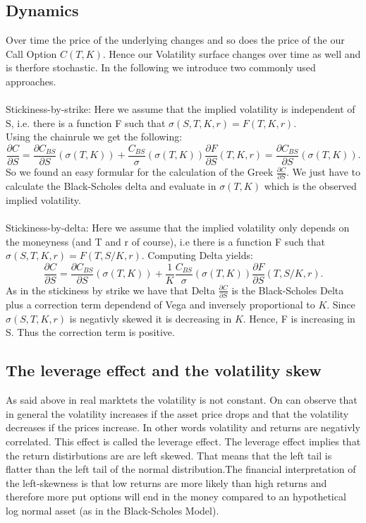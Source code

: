 \documentclass[12pt]{article}
\newcommand{\C}{C_{BS}}
\begin{document}
\subsection{Dynamics}
Over time the price of the underlying changes and so does the price of the our Call Option $C(T,K)$. Hence our Volatility surface changes over time as well and is therfore stochastic. In the following we introduce two commonly used approaches.\\\\
Stickiness-by-strike: Here we assume that the implied volatility is independent of S, i.e. there is a function F such that $\sigma(S,T,K,r)=F(T,K,r)$.\\
Using the chainrule we get the following:
$$\frac{\partial C}{\partial S}=\frac{\partial\C}{\partial S}(\sigma(T,K))+\frac{\C}{\sigma}(\sigma(T,K))\frac{\partial F}{\partial S}(T,K,r)=\frac{\partial\C}{\partial S}(\sigma(T,K)).$$
So we found an easy formular for the calculation of the Greek $\frac{\partial C}{\partial S}$. We just have to calculate the Black-Scholes delta and evaluate in $\sigma(T,K)$ which is the observed implied volatility. \\\\
Stickiness-by-delta: Here we assume that the implied volatility only depends on the moneyness (and T and r of course), i.e there is a function F such that $\sigma(S,T,K,r)=F(T,S/K,r)$. Computing Delta yields:
$$\frac{\partial C}{\partial S}=\frac{\partial\C}{\partial S}(\sigma(T,K))+\frac{1}{K}\frac{\C}{\sigma}(\sigma(T,K))\frac{\partial F}{\partial S}(T,S/K,r) .$$
As in the stickiness by strike we have that Delta $\frac{\partial C}{\partial S}$ is the Black-Scholes Delta plus a correction term dependend of Vega and inversely proportional to $K$. Since $\sigma(S,T,K,r)$ is negativly skewed it is decreasing in $K$. Hence, F is increasing in S. Thus the correction term is positive.\\


\subsection{The leverage effect and the volatility skew}
As said above in real marktets the volatility is not constant. On can observe that in general the volatility increases if the asset price drops and that the volatility decreases if the prices increase. In other words volatility and returns are negativly correlated. This effect is called the leverage effect. The leverage effect implies that the return distirbutions are are left skewed. That means that the left tail is flatter than the left tail of the normal distribution.The financial interpretation of the left-skewness is that low returns are more likely than high returns and therefore more put options will end in the money compared to an hypothetical log normal asset (as in the Black-Scholes Model).
\end{document}
